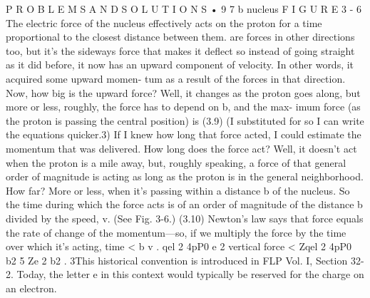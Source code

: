\documentclass[10pt,oneside]{article}
\begin{document}
P R O B L E M S  A N D  S O L U T I O N S • 9 7 b nucleus F I G U R E  3 - 6 The electric force of the nucleus effectively acts on the proton for a time proportional to the closest distance between them. are forces in other directions too, but it’s the sideways force that makes it deflect so instead of going straight as it did before, it now has an upward component of velocity. In other words, it acquired some upward momen- tum as a result of the forces in that direction. Now, how big is the upward force? Well, it changes as the proton goes along, but more or less, roughly, the force has to depend on b, and the max- imum force (as the proton is passing the central position) is (3.9) (I substituted for so I can write the equations quicker.3) If I knew how long that force acted, I could estimate the momentum that was delivered. How long does the force act? Well, it doesn’t act when the proton is a mile away, but, roughly speaking, a force of that general order of magnitude is acting as long as the proton is in the general neighborhood. How far? More or less, when it’s passing within a distance b of the nucleus. So the time during which the force acts is of an order of magnitude of the distance b divided by the speed, v. (See Fig. 3-6.) (3.10) Newton’s law says that force equals the rate of change of the momentum---so, if we multiply the force by the time over which it’s acting, time < b v . qel 2 4pP0 e 2 vertical force < Zqel 2 4pP0 b2 5 Ze 2 b2 . 3This historical convention is introduced in FLP Vol. I, Section 32-2. Today, the letter e in this context would typically be reserved for the charge on an electron.\par
\end{document}
